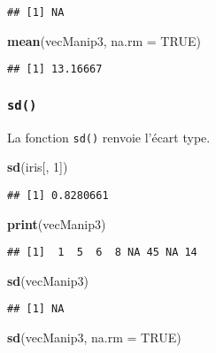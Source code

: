 \documentclass[]{book}
\newenvironment{Shaded}{\begin{snugshade}}{\end{snugshade}}
\newcommand{\KeywordTok}[1]{\textcolor[rgb]{0.13,0.29,0.53}{\textbf{#1}}}
\newcommand{\DataTypeTok}[1]{\textcolor[rgb]{0.13,0.29,0.53}{#1}}
\newcommand{\DecValTok}[1]{\textcolor[rgb]{0.00,0.00,0.81}{#1}}
\newcommand{\OtherTok}[1]{\textcolor[rgb]{0.56,0.35,0.01}{#1}}
\newcommand{\NormalTok}[1]{#1}
\theoremstyle{definition}
\theoremstyle{definition}
\theoremstyle{definition}
\theoremstyle{remark}
\begin{document}
\begin{verbatim}
## [1] NA
\end{verbatim}

\begin{Shaded}
\begin{Highlighting}[]
\KeywordTok{mean}\NormalTok{(vecManip3, }\DataTypeTok{na.rm =} \OtherTok{TRUE}\NormalTok{)}
\end{Highlighting}
\end{Shaded}

\begin{verbatim}
## [1] 13.16667
\end{verbatim}

\subsubsection{\texorpdfstring{\texttt{sd()}}{sd()}}\label{l015sd}

La fonction \texttt{sd()} renvoie l'écart type.

\begin{Shaded}
\begin{Highlighting}[]
\KeywordTok{sd}\NormalTok{(iris[, }\DecValTok{1}\NormalTok{])}
\end{Highlighting}
\end{Shaded}

\begin{verbatim}
## [1] 0.8280661
\end{verbatim}

\begin{Shaded}
\begin{Highlighting}[]
\KeywordTok{print}\NormalTok{(vecManip3)}
\end{Highlighting}
\end{Shaded}

\begin{verbatim}
## [1]  1  5  6  8 NA 45 NA 14
\end{verbatim}

\begin{Shaded}
\begin{Highlighting}[]
\KeywordTok{sd}\NormalTok{(vecManip3)}
\end{Highlighting}
\end{Shaded}

\begin{verbatim}
## [1] NA
\end{verbatim}

\begin{Shaded}
\begin{Highlighting}[]
\KeywordTok{sd}\NormalTok{(vecManip3, }\DataTypeTok{na.rm =} \OtherTok{TRUE}\NormalTok{)}
\end{Highlighting}
\end{Shaded}
\end{document}
